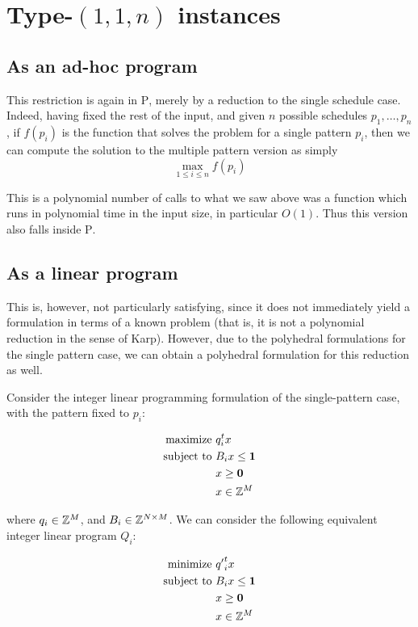 \section{Type-$(1, 1, n)$ instances}

\subsection{As an ad-hoc program}
This restriction is again in \textsc{P}, merely by a reduction to the single schedule case. Indeed, having fixed the rest of the input, and given $n$ possible schedules $p_1, \dots, p_n$, if $f(p_i)$ is the function that solves the problem for a single pattern $p_i$, then we can compute the solution to the multiple pattern version as simply
$$
\max_{1 \le i \le n} f(p_i)
$$

This is a polynomial number of calls to what we saw above was a function which runs in polynomial time in the input size, in particular $O(1)$. Thus this version also falls inside \textsc{P}.

\subsection{As a linear program}
This is, however, not particularly satisfying, since it does not immediately yield a formulation in terms of a known problem (that is, it is not a polynomial reduction in the sense of Karp). However, due to the polyhedral formulations for the single pattern case, we can obtain a polyhedral formulation for this reduction as well.

Consider the integer linear programming formulation of the single-pattern case, with the pattern fixed to $p_i$:

\begin{alignat*}{2}
  \text{maximize } & q_i^t x \\
  \text{subject to } & B_i x \le \mathbf{1}\\
                     & x \ge \mathbf{0}\\
                     & x \in \mathbb{Z}^M
\end{alignat*}

where $q_i \in \mathbb{Z}^M$, and $B_i \in \mathbb{Z}^{N \times M}$. We can consider the following equivalent integer linear program $Q_i$:

\begin{alignat}{2}
  \text{minimize } & {q'}_i^t x \\
  \text{subject to } & B_i x \le \mathbf{1}\\
                     & x \ge \mathbf{0}\\
                     & x \in \mathbb{Z}^M
\end{alignat}

